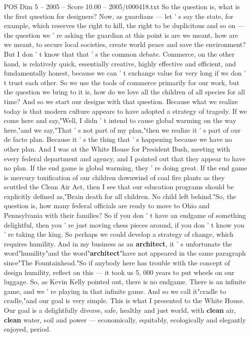 \begin{textsample}{POS Dim 5 – 2005 – Score 10.00 – 2005/t000418.txt}
So the question is, what is the first question for designers?
Now, as guardians — let ' s say the state, for example, which reserves the right to kill, the right to be duplicitous and so on — the question we ' re asking the guardian at this point is are we meant, how are we meant, to secure local societies, create world peace and save the environment?
But I don ' t know that that ' s the common debate.
Commerce, on the other hand, is relatively quick, essentially creative, highly effective and efficient, and fundamentally honest, because we can ' t exchange value for very long if we don ' t trust each other.
So we use the tools of commerce primarily for our work, but the question we bring to it is, how do we love all the children of all species for all time?
And so we start our designs with that question.
Because what we realize today is that modern culture appears to have adopted a strategy of tragedy.
If we come here and say,"Well, I didn ' t intend to cause global warming on the way here,"and we say,"That ' s not part of my plan,"then we realize it ' s part of our de facto plan.
Because it ' s the thing that ' s happening because we have no other plan.
And I was at the White House for President Bush, meeting with every federal department and agency, and I pointed out that they appear to have no plan.
If the end game is global warming, they ' re doing great.
If the end game is mercury toxification of our children downwind of coal fire plants as they scuttled the Clean Air Act, then I see that our education programs should be explicitly defined as,"Brain death for all children.
No child left behind."So, the question is, how many federal officials are ready to move to Ohio and Pennsylvania with their families?
So if you don ' t have an endgame of something delightful, then you ' re just moving chess pieces around, if you don ' t know you ' re taking the king.
So perhaps we could develop a strategy of change, which requires humility.
And in my business as an \textbf{architect}, it ' s unfortunate the word"humility"and the word"\textbf{architect}"have not appeared in the same paragraph since"The Fountainhead."So if anybody here has trouble with the concept of design humility, reflect on this — it took us 5, 000 years to put wheels on our luggage.
So, as Kevin Kelly pointed out, there is no endgame.
There is an infinite game, and we ' re playing in that infinite game.
And so we call it"cradle to cradle,"and our goal is very simple.
This is what I presented to the White House.
Our goal is a delightfully diverse, safe, healthy and just world, with \textbf{clean} air, \textbf{clean} water, soil and power — economically, equitably, ecologically and elegantly enjoyed, period.

\end{textsample}

